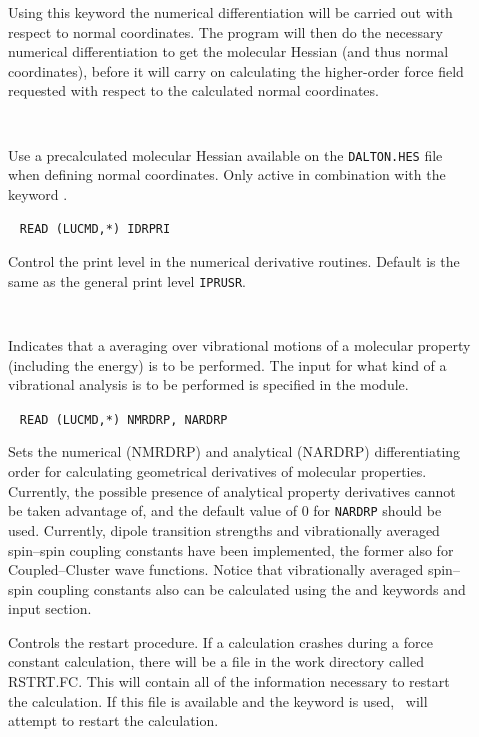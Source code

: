 \begin{description}
\item[]
Using this keyword the numerical differentiation will be carried out
with respect to normal coordinates. The program will then do the
necessary numerical differentiation to get the molecular Hessian (and thus
normal coordinates), before it will carry on calculating the
higher-order force field requested with respect to the calculated normal
coordinates.

\item[]\verb| |\newline

Use a precalculated molecular Hessian available on the \verb|DALTON.HES| file
when defining normal coordinates. Only active in combination with the
keyword .

\item[]\verb| |\newline
\verb|READ (LUCMD,*) IDRPRI|

Control the print level in the numerical derivative routines. Default
is the same as the general print level \verb|IPRUSR|.

\item[]\verb| |\newline

Indicates that a averaging over vibrational motions of a molecular
property (including the energy) is to be performed. The input
for what kind of a vibrational analysis is to be performed is
specified in the  module.

\item[]\verb| |\newline
\verb|READ (LUCMD,*) NMRDRP, NARDRP|

Sets the numerical (NMRDRP) and analytical (NARDRP) differentiating
order for calculating geometrical derivatives of molecular
properties. Currently, the possible presence of analytical property
derivatives cannot be taken advantage of, and the default value of $0$
for \verb|NARDRP| should be used. Currently, dipole transition
strengths and vibrationally averaged spin--spin coupling constants
have been implemented, the former also for Coupled--Cluster wave
functions. Notice that vibrationally
averaged spin--spin coupling constants also can be calculated using
the  and  keywords and input section.

\item[]
Controls the restart procedure. If a calculation crashes during a
force constant calculation, there will be a file in the work directory
called RSTRT.FC. This will contain all of the information necessary to
restart the calculation. If this file is available and the keyword is
used, \dalton\ will attempt to restart the calculation.


\end{description}
